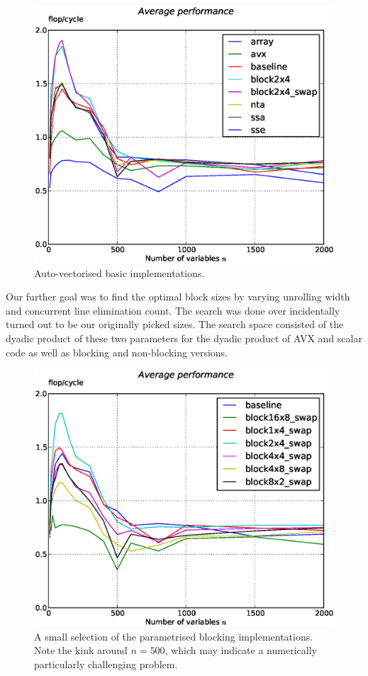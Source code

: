\documentclass[letterpaper]{article}
\begin{document}
\begin{figure}\centering
  \includegraphics[scale=0.4]{img/results_basic_autovec.eps}
  \caption{Auto-vectorised basic implementations.\label{res_basic_autovec}}
\end{figure}


Our further goal was to find the optimal block sizes by varying unrolling width and concurrent line elimination count. The search was done over incidentally turned out to be our originally picked sizes.
The search space consisted of the dyadic product of these two parameters for the dyadic product of AVX and scalar code as well as blocking and non-blocking versions.

\begin{figure}\centering
  \includegraphics[scale=0.4]{img/results_find_blocks.eps}
  \caption{A small selection of the parametrised blocking implementations. Note the kink around $n=500$, which may indicate a numerically particularly challenging problem.\label{res_findblock}}
\end{figure}
\end{document}
